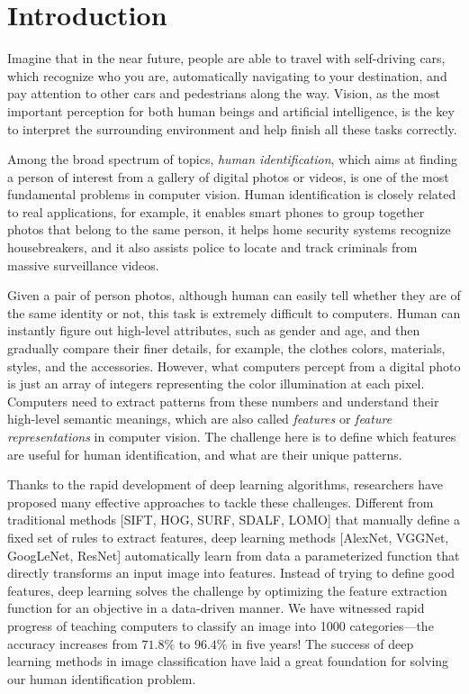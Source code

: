 \chapter{Introduction}
\label{ch:introduction}

Imagine that in the near future, people are able to travel with self-driving cars, which recognize who you are, automatically navigating to your destination, and pay attention to other cars and pedestrians along the way. Vision, as the most important perception for both human beings and artificial intelligence, is the key to interpret the surrounding environment and help finish all these tasks correctly.

Among the broad spectrum of topics, \emph{human identification}, which aims at finding a person of interest from a gallery of digital photos or videos, is one of the most fundamental problems in computer vision. Human identification is closely related to real applications, for example, it enables smart phones to group together photos that belong to the same person, it helps home security systems recognize housebreakers, and it also assists police to locate and track criminals from massive surveillance videos.

Given a pair of person photos, although human can easily tell whether they are of the same identity or not, this task is extremely difficult to computers. Human can instantly figure out high-level attributes, such as gender and age, and then gradually compare their finer details, for example, the clothes colors, materials, styles, and the accessories. However, what computers percept from a digital photo is just an array of integers representing the color illumination at each pixel. Computers need to extract patterns from these numbers and understand their high-level semantic meanings, which are also called \emph{features} or \emph{feature representations} in computer vision. The challenge here is to define which features are useful for human identification, and what are their unique patterns.

Thanks to the rapid development of deep learning algorithms, researchers have proposed many effective approaches to tackle these challenges. Different from traditional methods [SIFT, HOG, SURF, SDALF, LOMO] that manually define a fixed set of rules to extract features, deep learning methods [AlexNet, VGGNet, GoogLeNet, ResNet] automatically learn from data a parameterized function that directly transforms an input image into features. Instead of trying to define good features, deep learning solves the challenge by optimizing the feature extraction function for an objective in a data-driven manner. We have witnessed rapid progress of teaching computers to classify an image into 1000 categories---the accuracy increases from $71.8\%$ to $96.4\%$ in five years! The success of deep learning methods in image classification have laid a great foundation for solving our human identification problem.

